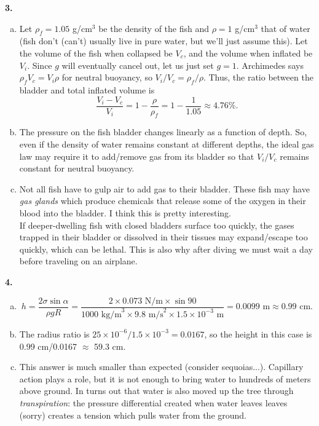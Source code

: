 \documentclass[11pt]{article}
\newcommand{\f}[2]{\frac{#1}{#2}}
\begin{document}
\noindent \textbf{3.} 
\begin{enumerate}[(a)]
	\item Let $\rho_f = 1.05$ g/cm$^3$ be the density of the fish and $\rho = 1$ g/cm$^3$ that of water (fish don't (can't) usually live in pure water, but we'll just assume this). Let the volume of the fish when collapsed be $V_c$, and the volume when inflated be $V_i$. Since $g$ will eventually cancel out, let us just set $g=1$. Archimedes says $\rho_f V_c = V_i \rho $ for neutral buoyancy, so $V_i/V_c = \rho_f/\rho$. Thus, the ratio between the bladder and total inflated volume is 
	\begin{equation*}
	\f{V_i - V_c}{V_i} = 1 - \f{\rho}{\rho_f} = 1 - \f{1}{1.05} \approx 4.76\%.
	\end{equation*}
	
	
	\item The pressure on the fish bladder changes linearly as a function of depth. So, even if the density of water remains constant at different depths, the ideal gas law may require it to add/remove gas from its bladder so that $V_i/V_c$ remains constant for neutral buoyancy. 
	
	\item Not all fish have to gulp air to add gas to their bladder. These fish may have \textit{gas glands} which produce chemicals that release some of the oxygen in their blood into the bladder. I think this is pretty interesting.\\
	
	If deeper-dwelling fish with closed bladders surface too quickly, the gases trapped in their bladder or dissolved in their tissues may expand/escape too quickly, which can be lethal. This is also why after diving we must wait a day before traveling on an airplane.
\end{enumerate}


\noindent \textbf{4.} 
\begin{enumerate}[(a)]
	\item 
	\begin{equation*}
	h = \f{2\sigma \sin \alpha}{\rho g R} = \f{2\times 0.073 \text{ N/m} \times \sin 90}{1000 \text{ kg/m}^{3} \times 9.8 \text{ m/s}^2 \times 1.5\times 10^{-3} \text{ m}} = 0.0099 \text{ m} \approx 0.99 \text{ cm}.
	\end{equation*}
	
	\item The radius ratio is $25 \times 10^{-6} /  1.5\times 10^{-3} = 0.0167$, so the height in this case is 0.99 cm/0.0167 $\approx$ 59.3 cm. 
	
	\item This answer is much smaller than expected (consider sequoias...). Capillary action plays a role, but it is not enough to bring water to hundreds of meters above ground. In turns out that water is also moved up the tree through \textit{transpiration}: the pressure differential created when water leaves leaves (sorry) creates a tension which pulls water from the ground. 
\end{enumerate}
\end{document}
